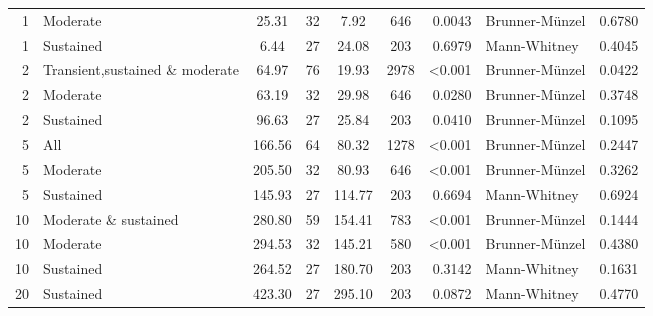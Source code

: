 \begin{table}[H]
\begin{tabular}{r p{4cm} c c c c r l r}
1 & Moderate &  25.31 & 32 & 7.92 & 646 & 0.0043 &  Brunner-Münzel & 0.6780 \\ 
1 & Sustained &  6.44 & 27 & 24.08 & 203 & 0.6979 &  Mann-Whitney & 0.4045 \\ 
2 & Transient,sustained \& moderate &  64.97 & 76 & 19.93 & 2978 & \textless 0.001 &  Brunner-Münzel & 0.0422 \\ 
2 & Moderate &  63.19 & 32 & 29.98 & 646 & 0.0280 &  Brunner-Münzel & 0.3748 \\ 
2 & Sustained &  96.63 & 27 & 25.84 & 203 & 0.0410 &  Brunner-Münzel & 0.1095 \\ 
5 & All &  166.56 & 64 & 80.32 & 1278 & \textless 0.001 &  Brunner-Münzel & 0.2447 \\ 
5 & Moderate &  205.50 & 32 & 80.93 & 646 & \textless 0.001 &  Brunner-Münzel & 0.3262 \\ 
5 & Sustained &  145.93 & 27 & 114.77 & 203 & 0.6694 &  Mann-Whitney & 0.6924 \\ 
10 & Moderate \& sustained &  280.80 & 59 & 154.41 & 783 & \textless 0.001 &  Brunner-Münzel & 0.1444 \\ 
10 & Moderate &  294.53 & 32 & 145.21 & 580 & \textless 0.001 &  Brunner-Münzel & 0.4380 \\ 
10 & Sustained &  264.52 & 27 & 180.70 & 203 & 0.3142 &  Mann-Whitney & 0.1631 \\ 
20 & Sustained &  423.30 & 27 & 295.10 & 203 & 0.0872 &  Mann-Whitney & 0.4770 \\ 
\bottomrule
\end{tabular}%
\label{tab:codebase_graph_latex_repository_graph_component_time_series_statistical_significance_test_methodsnormal_previous} 
\end{table}
\newpage 
